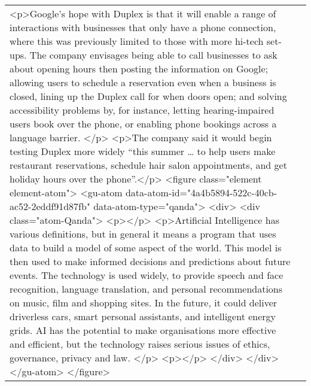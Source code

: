 \documentclass[]{article}
\begin{document}
\begin{table}[!h]
{\begin{tabular}[t]{ll}
<p>Google’s hope with Duplex is that it will enable a range of interactions with businesses that only have a phone connection, where this was previously limited to those with more hi-tech set-ups. The company envisages being able to call businesses to ask about opening hours then posting the information on Google; allowing users to schedule a reservation even when a business is closed, lining up the Duplex call for when doors open; and solving accessibility problems by, for instance, letting hearing-impaired users book over the phone, or enabling phone bookings across a language barrier. </p> 
<p>The company said it would begin testing Duplex more widely “this summer … to help users make restaurant reservations, schedule hair salon appointments, and get holiday hours over the phone”.</p> 
<figure class="element element-atom"> 
 <gu-atom data-atom-id="4a4b5894-522c-40cb-ac52-2eddf91d87fb" data-atom-type="qanda"> 
  <div>
   <div class="atom-Qanda">
    <p></p>
    <p>Artificial Intelligence has various definitions, but in general it means a program that uses data to build a model of some aspect of the world. This model is then used to make informed decisions and predictions about future events. The technology is used widely, to provide speech and face recognition, language translation, and personal recommendations on music, film and shopping sites. In the future, it could deliver driverless cars, smart personal assistants, and intelligent energy grids. AI has the potential to make organisations more effective and efficient, but the technology raises serious issues of ethics, governance, privacy and law. </p>
    <p></p>
   </div>
  </div>
 </gu-atom> 
</figure>\\

\end{tabular}}
\end{table}
\end{document}
